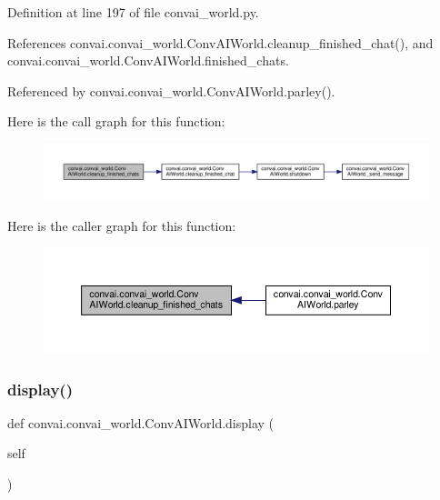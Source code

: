 Definition at line 197 of file convai\+\_\+world.\+py.



References convai.\+convai\+\_\+world.\+Conv\+A\+I\+World.\+cleanup\+\_\+finished\+\_\+chat(), and convai.\+convai\+\_\+world.\+Conv\+A\+I\+World.\+finished\+\_\+chats.



Referenced by convai.\+convai\+\_\+world.\+Conv\+A\+I\+World.\+parley().

Here is the call graph for this function\+:
\nopagebreak
\begin{figure}[H]
\begin{center}
\leavevmode
\includegraphics[width=350pt]{classconvai_1_1convai__world_1_1ConvAIWorld_a6263e23aeeed1da1714dfb48f61ab09d_cgraph}
\end{center}
\end{figure}
Here is the caller graph for this function\+:
\nopagebreak
\begin{figure}[H]
\begin{center}
\leavevmode
\includegraphics[width=350pt]{classconvai_1_1convai__world_1_1ConvAIWorld_a6263e23aeeed1da1714dfb48f61ab09d_icgraph}
\end{center}
\end{figure}
\mbox{\label{classconvai_1_1convai__world_1_1ConvAIWorld_aba441045b286ea6345701ca6295a4ba5}} 
\subsubsection{\texorpdfstring{display()}{display()}}
{\footnotesize\ttfamily def convai.\+convai\+\_\+world.\+Conv\+A\+I\+World.\+display (\begin{DoxyParamCaption}\item[{}]{self }\end{DoxyParamCaption})}



